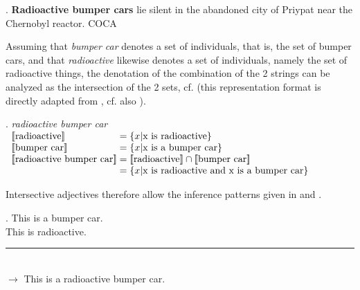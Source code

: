 \ex. \label{ex:radioactive_bumper-cars}
\textbf{Radioactive bumper cars} lie silent in the abandoned city of
Priypat near the Chernobyl reactor. COCA

Assuming that \emph{bumper car} denotes a set of
individuals, that is, the set of bumper cars, and that
\emph{radioactive} likewise denotes a set of individuals, namely the
set of radioactive things, the denotation of the combination of the
2 strings can be analyzed as the intersection of the 2
sets, cf. \Next (this representation format is directly adapted from
\citealt{KampandPartee:1995}, cf. also \citealt{Partee:1995}).



\ex. \emph{radioactive bumper car}\\
$\begin{array}[H]{l@{\;=\;}l}
[\![\mbox{radioactive}]\!] & \{x|\mbox{x is radioactive}\} \tabularnewline
{}[\![\mbox{bumper car}]\!] & \{x|\mbox{x is a bumper car}\}\\
{}[\![\mbox{radioactive bumper car}]\!]&[\![\mbox{radioactive}]\!]\cap
[\![\mbox{bumper car}]\!]\\
&\{x|\mbox{x \mbox{is radioactive and} x \mbox{is a bumper car}}\}%
\end{array}$

Intersective adjectives therefore allow the inference patterns given
in \Next and \NNext.\enlargethispage{1.5\baselineskip}

\ex. \label{ex:radioactive-bumpercar} This is a bumper car.\\
This is radioactive.\vspace{-0.2cm}\\
\rule{3.3cm}{.3mm}\\
$\rightarrow$ This is a radioactive bumper car.

